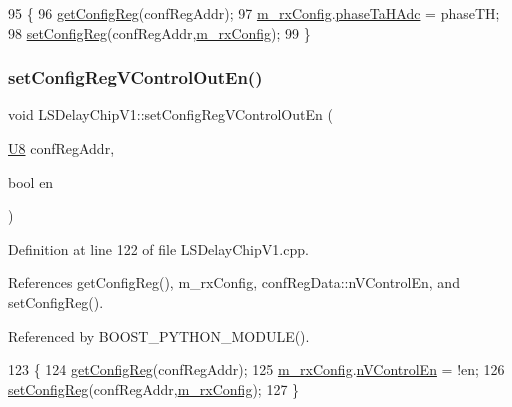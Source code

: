 \begin{DoxyCode}
95 \{
96     \hyperlink{classLSDelayChipV1_a4f338071d49df7eae55020a5f5fa8474}{getConfigReg}(confRegAddr);
97     \hyperlink{classLSDelayChipV1_a4818ac5c0d7ccf2845a01226234bdb67}{m\_rxConfig}.\hyperlink{structconfRegData_a2e471f30b32e57270cb2edb0e420cf1b}{phaseTaHAdc} = phaseTH;
98     \hyperlink{classLSDelayChipV1_a11fa2ebfa37c5cf0544ddb68c7d43e94}{setConfigReg}(confRegAddr,\hyperlink{classLSDelayChipV1_a4818ac5c0d7ccf2845a01226234bdb67}{m\_rxConfig});
99 \}
\end{DoxyCode}
\mbox{\label{classLSDelayChipV1_afd8a57dda2cd6a62607cbfc9808c3220}} 
\subsubsection{\texorpdfstring{set\+Config\+Reg\+V\+Control\+Out\+En()}{setConfigRegVControlOutEn()}}
{\footnotesize\ttfamily void L\+S\+Delay\+Chip\+V1\+::set\+Config\+Reg\+V\+Control\+Out\+En (\begin{DoxyParamCaption}\item[{\hyperlink{ICECALv3_8h_a3cb25ca6f51f003950f9625ff05536fc}{U8}}]{conf\+Reg\+Addr,  }\item[{bool}]{en }\end{DoxyParamCaption})}



Definition at line 122 of file L\+S\+Delay\+Chip\+V1.\+cpp.



References get\+Config\+Reg(), m\+\_\+rx\+Config, conf\+Reg\+Data\+::n\+V\+Control\+En, and set\+Config\+Reg().



Referenced by B\+O\+O\+S\+T\+\_\+\+P\+Y\+T\+H\+O\+N\+\_\+\+M\+O\+D\+U\+L\+E().


\begin{DoxyCode}
123 \{
124     \hyperlink{classLSDelayChipV1_a4f338071d49df7eae55020a5f5fa8474}{getConfigReg}(confRegAddr);
125     \hyperlink{classLSDelayChipV1_a4818ac5c0d7ccf2845a01226234bdb67}{m\_rxConfig}.\hyperlink{structconfRegData_a62f72429bde3ede255f6d8dfe1401c37}{nVControlEn} = !en;
126     \hyperlink{classLSDelayChipV1_a11fa2ebfa37c5cf0544ddb68c7d43e94}{setConfigReg}(confRegAddr,\hyperlink{classLSDelayChipV1_a4818ac5c0d7ccf2845a01226234bdb67}{m\_rxConfig});
127 \}
\end{DoxyCode}
\mbox{\label{classElement_ab476b4b1df5954141ceb14f072433b89}} 
